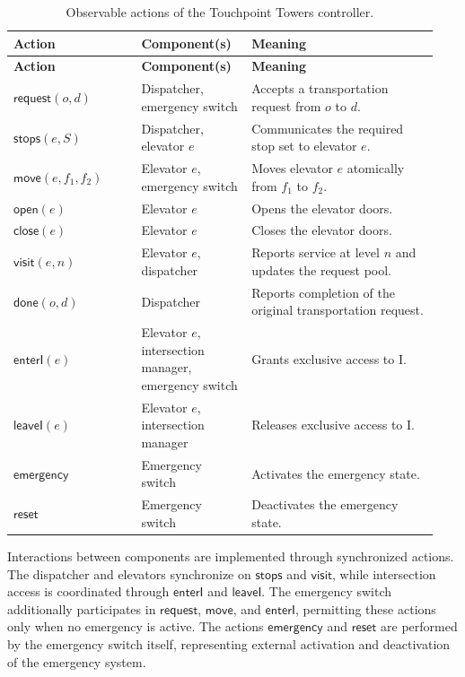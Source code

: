 \begingroup
\small
\renewcommand{\arraystretch}{1.15}
\begin{longtable}{@{}p{0.29\linewidth}p{0.24\linewidth}p{0.41\linewidth}@{}}
  \caption{Observable actions of the Touchpoint Towers controller.}\label{tab:actions}\\
  \toprule
  \textbf{Action} & \textbf{Component(s)} & \textbf{Meaning}\\
  \midrule
  \endfirsthead
  \toprule
  \textbf{Action} & \textbf{Component(s)} & \textbf{Meaning}\\
  \midrule
  \endhead
  \bottomrule
  \endfoot
  \(\mathsf{request}(o,d)\) & Dispatcher, emergency switch & Accepts a transportation request from \(o\) to \(d\).\\
  \(\mathsf{stops}(e,S)\) & Dispatcher, elevator \(e\) & Communicates the required stop set to elevator \(e\).\\
  \(\mathsf{move}(e,f_1,f_2)\) & Elevator \(e\), emergency switch & Moves elevator \(e\) atomically from \(f_1\) to \(f_2\).\\
  \(\mathsf{open}(e)\) & Elevator \(e\) & Opens the elevator doors.\\
  \(\mathsf{close}(e)\) & Elevator \(e\) & Closes the elevator doors.\\
  \(\mathsf{visit}(e,n)\) & Elevator \(e\), dispatcher & Reports service at level \(n\) and updates the request pool.\\
  \(\mathsf{done}(o,d)\) & Dispatcher & Reports completion of the original transportation request.\\
  \(\mathsf{enterI}(e)\) & Elevator \(e\), intersection manager, emergency switch & Grants exclusive access to I.\\
  \(\mathsf{leaveI}(e)\) & Elevator \(e\), intersection manager & Releases exclusive access to I.\\
  \(\mathsf{emergency}\) & Emergency switch & Activates the emergency state.\\
  \(\mathsf{reset}\) & Emergency switch & Deactivates the emergency state.\\
\end{longtable}
\endgroup

Interactions between components are implemented through synchronized actions. The dispatcher and elevators synchronize on \(\mathsf{stops}\) and \(\mathsf{visit}\), while intersection access is coordinated through \(\mathsf{enterI}\) and \(\mathsf{leaveI}\). The emergency switch additionally participates in \(\mathsf{request}\), \(\mathsf{move}\), and \(\mathsf{enterI}\), permitting these actions only when no emergency is active. The actions \(\mathsf{emergency}\) and \(\mathsf{reset}\) are performed by the emergency switch itself, representing external activation and deactivation of the emergency system.

